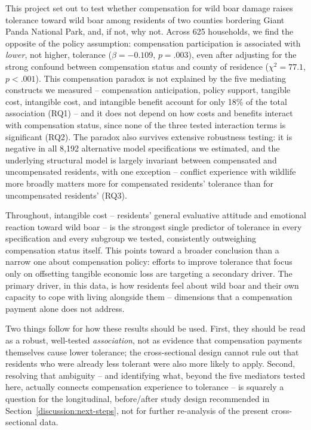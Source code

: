 This project set out to test whether compensation for wild boar damage
raises tolerance toward wild boar among residents of two counties bordering
Giant Panda National Park, and, if not, why not. Across 625 households, we
find the opposite of the policy assumption: compensation participation is
associated with \emph{lower}, not higher, tolerance ($\beta = -0.109$,
$p = .003$), even after adjusting for the strong confound between
compensation status and county of residence ($\chi^2 = 77.1$, $p < .001$).
This compensation paradox is not explained by the five mediating constructs
we measured -- compensation anticipation, policy support, tangible cost,
intangible cost, and intangible benefit account for only 18\% of the total
association (RQ1) -- and it does not depend on how costs and benefits
interact with compensation status, since none of the three tested
interaction terms is significant (RQ2). The paradox also survives extensive
robustness testing: it is negative in all 8{,}192 alternative model
specifications we estimated, and the underlying structural model is largely
invariant between compensated and uncompensated residents, with one
exception -- conflict experience with wildlife more broadly matters more for
compensated residents' tolerance than for uncompensated residents' (RQ3).

Throughout, intangible cost -- residents' general evaluative attitude and
emotional reaction toward wild boar -- is the strongest single predictor of
tolerance in every specification and every subgroup we tested, consistently
outweighing compensation status itself. This points toward a broader
conclusion than a narrow one about compensation policy: efforts to improve
tolerance that focus only on offsetting tangible economic loss are targeting
a secondary driver. The primary driver, in this data, is how residents feel
about wild boar and their own capacity to cope with living alongside them --
dimensions that a compensation payment alone does not address.

Two things follow for how these results should be used. First, they should
be read as a robust, well-tested \emph{association}, not as evidence that
compensation payments themselves cause lower tolerance; the cross-sectional
design cannot rule out that residents who were already less tolerant were
also more likely to apply. Second, resolving that ambiguity -- and
identifying what, beyond the five mediators tested here, actually connects
compensation experience to tolerance -- is squarely a question for the
longitudinal, before/after study design recommended in
Section~\ref{discussion:next-steps}, not for further re-analysis of the
present cross-sectional data.
